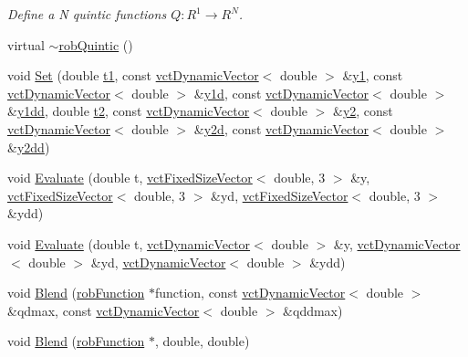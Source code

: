\begin{DoxyCompactItemize}
\begin{DoxyCompactList}\small\item\em Define a N quintic functions $Q: R^1\rightarrow R^N $. \end{DoxyCompactList}\item 
virtual \hyperlink{classrob_quintic_afd7ccda65afd80f996b6a19d7a103215}{$\sim$rob\-Quintic} ()
\item 
void \hyperlink{classrob_quintic_a198c9a4ed3f2102c4c6120ce7ce4736e}{Set} (double \hyperlink{classrob_function_a9a4b408a3a5a8ae927caec3b6bac36ef}{t1}, const \hyperlink{classvct_dynamic_vector}{vct\-Dynamic\-Vector}$<$ double $>$ \&\hyperlink{classrob_function_rn_aadf26230a697fedca000dac29ae27129}{y1}, const \hyperlink{classvct_dynamic_vector}{vct\-Dynamic\-Vector}$<$ double $>$ \&\hyperlink{classrob_function_rn_a0cd776a1eec33965d8cdce69c7c12902}{y1d}, const \hyperlink{classvct_dynamic_vector}{vct\-Dynamic\-Vector}$<$ double $>$ \&\hyperlink{classrob_function_rn_a44e2cfac47df0d9324c0d7d6251d680f}{y1dd}, double \hyperlink{classrob_function_abf15c2d695ab4cc6336e19862327858f}{t2}, const \hyperlink{classvct_dynamic_vector}{vct\-Dynamic\-Vector}$<$ double $>$ \&\hyperlink{classrob_function_rn_a982a35e7e6f235da34765d3ceeb91109}{y2}, const \hyperlink{classvct_dynamic_vector}{vct\-Dynamic\-Vector}$<$ double $>$ \&\hyperlink{classrob_function_rn_a99d86533626d78aa644816936ec01ac2}{y2d}, const \hyperlink{classvct_dynamic_vector}{vct\-Dynamic\-Vector}$<$ double $>$ \&\hyperlink{classrob_function_rn_af67e2c772c0550231dd2b768adbae702}{y2dd})
\item 
void \hyperlink{classrob_quintic_a49a40ea0affa3211fa47efcf262f5ff1}{Evaluate} (double t, \hyperlink{classvct_fixed_size_vector}{vct\-Fixed\-Size\-Vector}$<$ double, 3 $>$ \&y, \hyperlink{classvct_fixed_size_vector}{vct\-Fixed\-Size\-Vector}$<$ double, 3 $>$ \&yd, \hyperlink{classvct_fixed_size_vector}{vct\-Fixed\-Size\-Vector}$<$ double, 3 $>$ \&ydd)
\item 
void \hyperlink{classrob_quintic_aecad785cf06ff420602efbbb7d602eda}{Evaluate} (double t, \hyperlink{classvct_dynamic_vector}{vct\-Dynamic\-Vector}$<$ double $>$ \&y, \hyperlink{classvct_dynamic_vector}{vct\-Dynamic\-Vector}$<$ double $>$ \&yd, \hyperlink{classvct_dynamic_vector}{vct\-Dynamic\-Vector}$<$ double $>$ \&ydd)
\item 
void \hyperlink{classrob_quintic_a83fae85b7d93b04a6f6c9e8332f5b42a}{Blend} (\hyperlink{classrob_function}{rob\-Function} $\ast$function, const \hyperlink{classvct_dynamic_vector}{vct\-Dynamic\-Vector}$<$ double $>$ \&qdmax, const \hyperlink{classvct_dynamic_vector}{vct\-Dynamic\-Vector}$<$ double $>$ \&qddmax)
\item 
void \hyperlink{classrob_quintic_a09de038bd1087310919def65ae7e0062}{Blend} (\hyperlink{classrob_function}{rob\-Function} $\ast$, double, double)
\end{DoxyCompactItemize}
